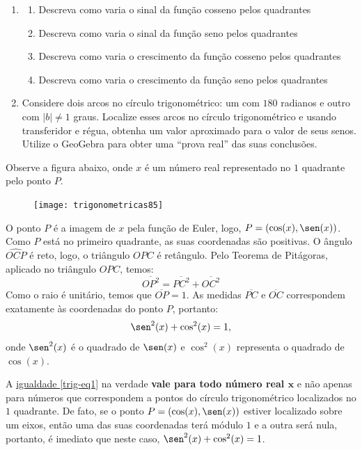 \begin{enumerate}
\item
\begin{enumerate}
\item Descreva como varia o sinal da função cosseno pelos quadrantes
\item Descreva como varia o sinal da função seno pelos quadrantes
\item Descreva como varia o crescimento da função cosseno pelos quadrantes
\item Descreva como varia o crescimento da função seno pelos quadrantes
\end{enumerate}
\item Considere dois arcos no círculo trigonométrico: um com $180$ radianos e outro com $|b|\neq1$ graus. Localize esses arcos no círculo trigonométrico e usando transferidor e régua, obtenha um valor aproximado para o valor de seus senos. Utilize o GeoGebra para obter uma “prova real”{} das suas conclusões.
\end{enumerate}


Observe a figura abaixo, onde $x$ é um número real representado no $1$ quadrante pelo ponto $P$.

\begin{figure}[H]
\centering

\texttt{[image: trigonometricas85]}

\end{figure}


O ponto $P$ é a imagem de $x$ pela função de Euler, logo, $P = (\cos(x), \sen(x))$. Como $P$ está no primeiro quadrante, as suas coordenadas são positivas. O ângulo $\widehat{OCP}$ é reto, logo, o triângulo $OPC$ é retângulo. Pelo Teorema de Pitágoras, aplicado no triângulo $OPC$, temos:
\begin{equation*}
\overline{OP^2}=\overline{PC^2}+\overline{OC^2}
\end{equation*}
Como o raio é unitário, temos que $\overline{OP}=1$. As medidas $\overline{PC}$ e $\overline{OC}$ correspondem exatamente às coordenadas do ponto $P$, portanto:
\begin{equation}
\label{trig-eq1}
\sen^2(x)+\cos^2(x)=1,
\end{equation}
onde $\sen^2(x)$ é o quadrado de $\sen(x)$ e $\cos^2(x)$ representa o quadrado de $\cos(x)$.


A \hyperref[trig-eq1]{igualdade \ref{trig-eq1}} na verdade \textbf{vale para todo número real $\bm{x}$} e não apenas para números que correspondem a pontos do círculo trigonométrico localizados no $1$ quadrante. De fato, se o ponto $P=(\cos(x),\sen(x))$ estiver localizado sobre um eixos, então uma das suas coordenadas terá módulo $1$ e a outra será nula, portanto, é imediato que neste caso, $\sen^2(x)+\cos^2(x)=1$.

